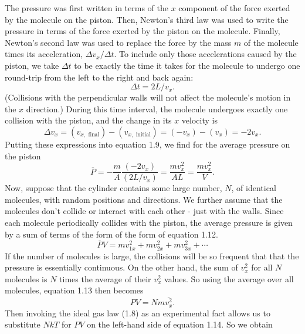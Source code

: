 \documentclass[11pt]{exam}
\begin{document}
The pressure was first written in terms of the $x$ component of the force exerted by the molecule on the piston. Then, Newton's third law was used to write the pressure in terms of the force exerted by the piston on the molecule. Finally, Newton's second law was used to replace the force by the mass $m$ of the molecule times its acceleration, $\Delta v_x/ \Delta t$. To include only those accelerations caused by the piston, we take $\Delta t$ to be exactly the time it takes for the molecule to undergo one round-trip from the left to the right and back again:
\begin{equation}\tag{1.10}
\Delta t = 2L/v_x.
\end{equation}
(Collisions with the perpendicular walls will not affect the molecule's motion in the $x$ direction.) During this time interval, the molecule undergoes exactly one collision with the piston, and the change in its $x$ velocity is 
\begin{equation}\tag{1.11}
\Delta v_x = (v_{x,\text{ final}}) - (v_{x,\text{ initial}}) = (-v_x)-(v_x)=-2v_x.
\end{equation}
Putting these expressions into equation 1.9, we find for the average pressure on the piston
\begin{equation}\tag{1.12}
\overline{P} = -\frac{m}{A}\frac{(-2v_x)}{(2L/v_x)}=\frac{mv_x^2}{AL}=\frac{mv_x^2}{V}.
\end{equation}
\hspace*{10mm}Now, suppose that the cylinder contains some large number, $N$, of identical molecules, with random positions and directions. We further assume that the molecules don't collide or interact with each other - just with the walls. Since each molecule periodically collides with the piston, the average pressure is given by a sum of terms of the form of the form of equation 1.12. 
\begin{equation}\tag{1.13}
\overline{P}V=mv_{1x}^2 + mv_{2x}^2 + mv_{3x}^2 + \cdots    
\end{equation}
If the number of molecules is large, the collisions will be so frequent that that the pressure is essentially continuous. On the other hand, the sum of $v_x^2$ for all $N$ molecules is $N$ times the average of their $v_x^2$ values. So using the average over all molecules, equation 1.13 then becomes 
\begin{equation}\tag{1.14}
PV = Nm\overline{v_x^2}. 
\end{equation}
Then invoking the ideal gas law (1.8) as an experimental fact allows us to substitute $NkT$ for $PV$ on the left-hand side of equation 1.14. So we obtain 
\end{document}
